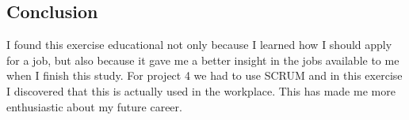 \documentclass[titlepage]{article}
\begin{document}
\subsection{Conclusion}
%
I found this exercise educational not only because I learned how I should apply
for a job, but also because it gave me a better insight in the jobs available to me
when I finish this study. For project 4 we had to use SCRUM and in this
exercise I discovered that this is actually used in the workplace. This has
made me more enthusiastic about my future career.
\end{document}
